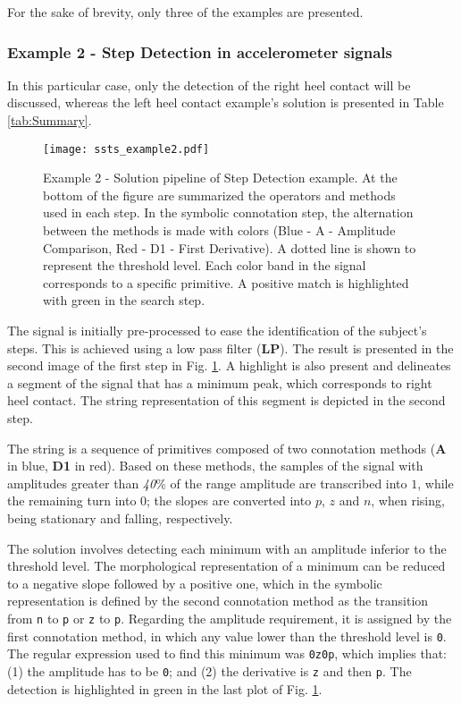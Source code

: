 For the sake of brevity, only three of the examples are presented.

\subsubsection{Example 2 - Step Detection in accelerometer signals}

In this particular case, only the detection of the right heel contact will be discussed, whereas the left heel contact example's solution is presented in Table \ref{tab:Summary}.

\begin{figure}[H]
  \centering
      \texttt{[image: ssts\_example2.pdf]}
  \caption{Example 2 - Solution pipeline of Step Detection example. At the bottom of the figure are summarized the operators and methods used in each step. In the symbolic connotation step, the alternation between the methods is made with colors (Blue - A - Amplitude Comparison, Red - D1 - First Derivative). A dotted line is shown to represent the threshold level. Each color band in the signal corresponds to a specific primitive. A positive match is highlighted with green in the search step.}
  \label{fig:Exercise2}
\end{figure}

The signal is initially pre-processed to ease the identification of the subject's steps. This is achieved using a low pass filter (\textbf{LP}). The result is presented in the second image of the first step in Fig. \ref{fig:Exercise2}. A highlight is also present and delineates a segment of the signal that has a minimum peak, which corresponds to right heel contact. The string representation of this segment is depicted in the second step.
\par
The string is a sequence of primitives composed of two connotation methods (\textbf{A} in blue, \textbf{D1} in red). Based on these methods, the samples of the signal with amplitudes greater than \textit{40}\% of the range amplitude are transcribed into $1$, while the remaining turn into $0$; the slopes are converted into $p$, $z$ and $n$, when rising, being stationary and falling, respectively.
\par
The solution involves detecting each minimum with an amplitude inferior to the threshold level. The morphological representation of a minimum can be reduced to a negative slope followed by a positive one, which in the symbolic representation is defined by the second connotation method as the transition from \texttt{n} to \texttt{p} or \texttt{z} to \texttt{p}. Regarding the amplitude requirement, it is assigned by the first connotation method, in which any value lower than the threshold level is \texttt{0}. The regular expression used to find this minimum was \texttt{0z0p}, which implies that: (1) the amplitude has to be \texttt{0}; and (2) the derivative is \texttt{z} and then \texttt{p}. The detection is highlighted in green in the last plot of Fig. \ref{fig:Exercise2}.

